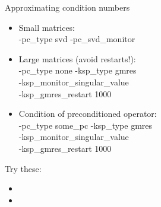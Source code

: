 \begin{frame}{Approximating condition numbers}

\begin{itemize}
\item Small matrices: \\
  {\kb -pc\_type svd -pc\_svd\_monitor}
\item Large matrices (avoid restarts!): \\
  {\kb -pc\_type none -ksp\_type gmres \bslash\\
    \qquad -ksp\_monitor\_singular\_value \bslash\\
    \qquad -ksp\_gmres\_restart 1000}
\item Condition of preconditioned operator: \\
  {\kb -pc\_type some\_pc -ksp\_type gmres \bslash \\
    \qquad -ksp\_monitor\_singular\_value \bslash \\
    \qquad -ksp\_gmres\_restart 1000}
\end{itemize}

Try these:

\begin{itemize}
\item {}
\item {}
\end{itemize}

\end{frame}
